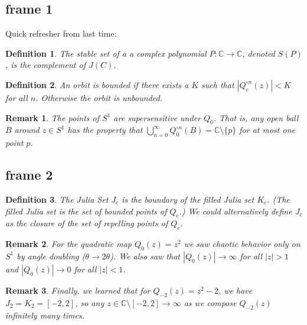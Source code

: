 \documentclass[xcolor=x11names,compress]{beamer}
\renewcommand{\(}{\begin{columns}}
\renewcommand{\)}{\end{columns}}
\newcommand{\<}[1]{\begin{column}{#1}}
\renewcommand{\>}{\end{column}}
\newtheorem{defn}{Definition}
\newtheorem{rmk}{Remark}
\begin{document}
\subsection{frame 1}
\begin{frame}

Quick refresher from last time:

\pause

\begin{defn}
The \textsl{stable set} of a a complex polynomial $P: \mathbb{C} \rightarrow \mathbb{C}$, denoted $S(P)$, is the complement of $J(C)$.
\end{defn}

\pause

\begin{defn}
An orbit is \textsl{bounded} if there exists a $K$ such that $|Q_c^{\circ n}(z)| < K$ for all $n$. Otherwise the orbit is \textsl{unbounded}.
\end{defn}

\pause

\begin{rmk}
The points of $S^1$ are \textsl{supersensitive} under $Q_{0}$. That is, any open ball $B$ around $z \in S^1$ has the property that $\bigcup_{n=0}^\infty Q_0^{\circ n} (B) = \mathbb{C} \setminus \{p\}$ for at most one point $p$.
\end{rmk}

\end{frame}


\subsection{frame 2}
\begin{frame}

\begin{defn}
The Julia Set $J_c$ is the boundary of the filled Julia set $K_c$. (The filled Julia set is the set of bounded points of $Q_c$.) We could alternatively define $J_c$ as the closure of the set of repelling points of $Q_c$.
\end{defn}

\pause


\begin{rmk}
For the quadratic map $Q_0(z) = z^2$ we saw chaotic behavior only on $S^1$ by angle doubling ($\theta \rightarrow 2\theta$). We also saw that $|Q_0(z)| \rightarrow \infty$ for all $|z| > 1$ and $|Q_0(z)| \rightarrow 0$ for all $|z| < 1$.
\end{rmk}

\pause


\begin{rmk}
Finally, we learned that for $Q_{-2}(z) = z^2 - 2$, we have $J_2 = K_2 = [-2, 2]$, so any $z \in \mathbb{C} \setminus [-2,2] \rightarrow \infty$ as we compose $Q_{-2}(z)$ infinitely many times. 
\end{rmk}

\end{frame}
\end{document}
